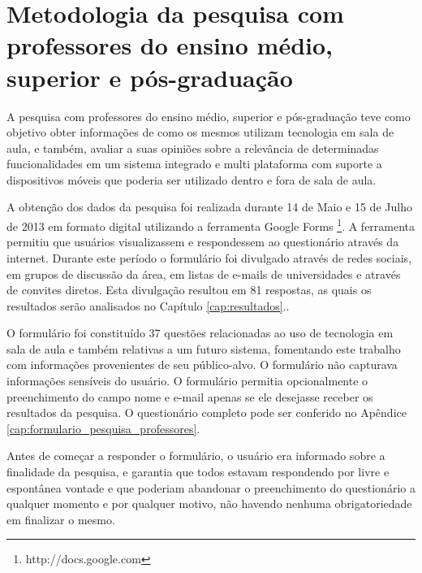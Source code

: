 
\section{Metodologia da pesquisa com professores do ensino médio, superior e pós-graduação}
\label{sec:metodologia_professores}

A pesquisa com professores do ensino médio, superior e pós-graduação teve como objetivo obter informações de como os mesmos utilizam tecnologia em sala de aula, e também, avaliar a suas opiniões sobre a relevância de determinadas funcionalidades em um sistema integrado e multi plataforma com suporte a dispositivos móveis que poderia ser utilizado dentro e fora de sala de aula.

A obtenção dos dados da pesquisa foi realizada durante 14 de Maio e 15 de Julho de 2013 em formato digital utilizando a ferramenta Google Forms \footnote{http://docs.google.com}. A ferramenta permitiu que usuários visualizassem e respondessem ao questionário através da internet. Durante este período o formulário foi divulgado através de redes sociais, em grupos de discussão da área, em listas de e-mails de universidades e através de convites diretos. Esta divulgação resultou em 81 respostas, as quais os resultados serão analisados no Capítulo \ref{cap:resultados}..

O formulário foi constituído 37 questões relacionadas ao uso de tecnologia em sala de aula e também relativas a um futuro sistema, fomentando este trabalho com informações provenientes de seu público-alvo. O formulário não capturava informações sensíveis do usuário. O formulário permitia opcionalmente o preenchimento do campo nome e e-mail apenas se ele desejasse receber os resultados da pesquisa. O questionário completo pode ser conferido no Apêndice \ref{cap:formulario_pesquisa_professores}.

Antes de começar a responder o formulário, o usuário era informado sobre a finalidade da pesquisa, e  garantia que todos estavam respondendo por livre e espontânea vontade e que poderiam abandonar o preenchimento do questionário a qualquer momento e por qualquer motivo, não havendo nenhuma obrigatoriedade em finalizar o mesmo.

